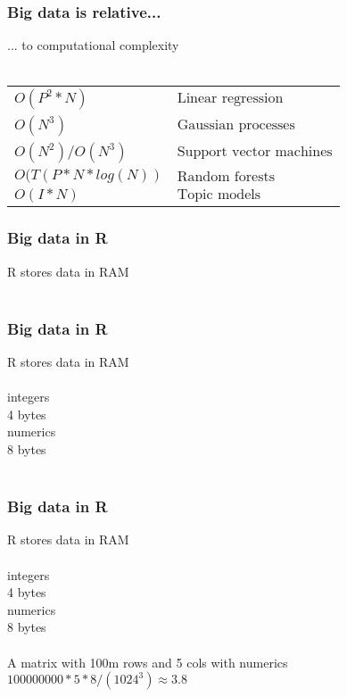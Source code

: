 \documentclass{beamer}
\begin{document}
\begin{frame}
	\frametitle{Big data is relative...}
	\begin{center}
		... to computational complexity\\~\\
		\begin{tabular}{ l l }
			$O(P^2 * N) $ & $ \text{Linear regression}$\\
			$O(N^3) $ & $ \text{Gaussian processes}$\\
			$O(N^2) / O(N^3) $ & $ \text{Support vector machines}$\\
			$O(T(P * N * log(N)) $ & $ \text{Random forests}$\\
			$O(I * N) $ & $ \text{Topic models}$\\
		\end{tabular}
	\end{center}
\end{frame}

\begin{frame}
	\frametitle{Big data in R}
	\begin{center}
		R stores data in RAM\\~\\
	\end{center}
\end{frame}

\begin{frame}
	\frametitle{Big data in R}
	\begin{center}
		R stores data in RAM\\~\\
		integers\\
		4 bytes\\
		numerics\\
		8 bytes\\~\\
	\end{center}
\end{frame}

\begin{frame}
	\frametitle{Big data in R}
	\begin{center}
		R stores data in RAM\\~\\
		integers\\
		4 bytes\\
		numerics\\
		8 bytes\\~\\
		A matrix with 100m rows and 5 cols with numerics \\
		$100000000 * 5 * 8 / (1024^3) \approx 3.8$
	\end{center}
\end{frame}
\end{document}
